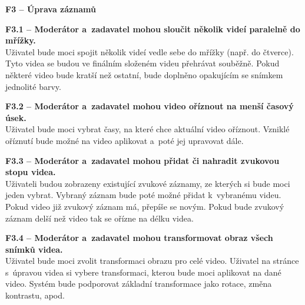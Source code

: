 \documentclass[thesis=M,czech]{FITthesis}[2012/06/26]
\begin{document}
\begin{description}
  \item \textbf{F3 -- Úprava záznamů}
  \begin{description}
    \item \textbf{F3.1 -- Moderátor a~zadavatel mohou sloučit několik videí paralelně do mřížky.\\}
	Uživatel bude moci spojit několik videí vedle sebe do mřížky (např. do čtverce). Tyto videa se budou ve finálním složeném videu přehrávat souběžně. Pokud některé video bude kratší než ostatní, bude doplněno opakujícím se snímkem jednolité barvy.
    \item \textbf{F3.2 -- Moderátor a~zadavatel mohou video oříznout na menší časový úsek.\\}
    Uživatel bude moci vybrat časy, na které chce aktuální video oříznout. Vzniklé oříznutí bude možné na video aplikovat a~poté jej upravovat dále.
    \item \textbf{F3.3 -- Moderátor a~zadavatel mohou přidat či nahradit zvukovou stopu videa.\\}
    Uživateli budou zobrazeny existující zvukové záznamy, ze kterých si bude moci jeden vybrat. Vybraný záznam bude poté možné přidat k~vybranému videu. Pokud video již zvukový záznam má, přepíše se novým. Pokud bude zvukový záznam delší než video tak se ořízne na délku videa.
    \item \textbf{F3.4 -- Moderátor a~zadavatel mohou transformovat obraz všech snímků videa.\\}
	Uživatel bude moci zvolit transformaci obrazu pro celé video. Uživatel na stránce s~úpravou videa si vybere transformaci, kterou bude moci aplikovat na dané video. Systém  bude podporovat základní transformace jako rotace, změna kontrastu, apod.
  \end{description}
  

\end{description}
\end{document}
